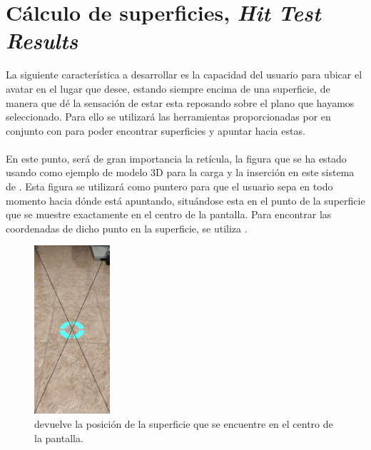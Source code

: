 \documentclass{subfiles}
\begin{document}
        \section{Cálculo de superficies, \textit{Hit Test Results}}
        \label{sec:3.2}
        La siguiente característica a desarrollar es la capacidad del usuario para ubicar el avatar en el lugar que desee, estando siempre encima de una superficie, de manera que dé la sensación de estar esta reposando sobre el plano que hayamos seleccionado. Para ello se utilizará las herramientas proporcionadas por \webxr en conjunto con \threejs para poder encontrar superficies y apuntar hacia estas.

        \paragraph{}
        En este punto, será de gran importancia la retícula, la figura que se ha estado usando como ejemplo de modelo 3D para la carga y la inserción en este sistema de \ra. Esta figura se utilizará como puntero para que el usuario sepa en todo momento hacia dónde está apuntando, situándose esta en el punto de la superficie que se muestre exactamente en el centro de la pantalla. Para encontrar las coordenadas de dicho punto en la superficie, se utiliza \hittest.

\begin{figure}
\centering
\includegraphics[width=0.25\textwidth]{img/hit-test-example.jpg}
\caption{\hittest devuelve la posición  de la superficie que se encuentre en el centro de la pantalla.}
\label{fig:hit-test-example}
\end{figure}
\end{document}
